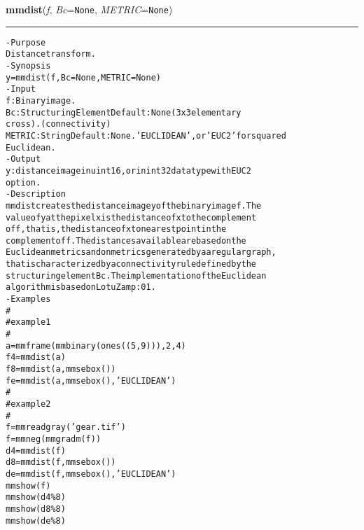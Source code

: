    \begin{boxedminipage}{\textwidth}

    \raggedright \textbf{mmdist}(\textit{f}, \textit{Bc}=\texttt{N\-o\-n\-e\-}, \textit{METRIC}=\texttt{N\-o\-n\-e\-})

    \vspace{-1.5ex}

    \rule{\textwidth}{0.5\fboxrule}
\begin{alltt}
- Purpose
    Distance transform.
- Synopsis
    y = mmdist(f, Bc=None, METRIC=None)
- Input
    f:      Binary image.
    Bc:     Structuring Element Default: None (3x3 elementary
            cross). (connectivity)
    METRIC: String Default: None. 'EUCLIDEAN', or 'EUC2' for squared
            Euclidean.
- Output
    y: distance image in uint16, or in int32 datatype with EUC2
       option.
- Description
    mmdist creates the distance image y of the binary image f . The
    value of y at the pixel x is the distance of x to the complement
    of f , that is, the distance of x to nearest point in the
    complement of f . The distances available are based on the
    Euclidean metrics and on metrics generated by a a regular graph,
    that is characterized by a connectivity rule defined by the
    structuring element Bc . The implementation of the Euclidean
    algorithm is based on LotuZamp:01 .
- Examples
    \#
    \#   example 1
    \#
    a = mmframe(mmbinary(ones((5,9))),2,4)
    f4=mmdist(a)
    f8=mmdist(a,mmsebox())
    fe=mmdist(a,mmsebox(),'EUCLIDEAN')
    \#
    \#   example 2
    \#
    f = mmreadgray('gear.tif')
    f = mmneg(mmgradm(f))
    d4=mmdist(f)
    d8=mmdist(f,mmsebox())
    de=mmdist(f,mmsebox(),'EUCLIDEAN')
    mmshow(f)
    mmshow(d4\%8)
    mmshow(d8\%8)
    mmshow(de\%8)\end{alltt}

    \vspace{1ex}

    \end{boxedminipage}

    \label{multireg:num_pymorph:mmdrawv}
    \vspace{0.5ex}

